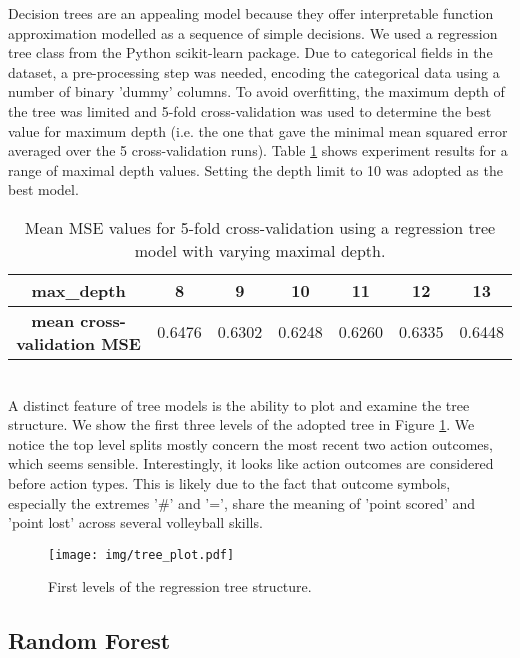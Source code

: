 \documentclass{sfuthesis}
\begin{document}
	Decision trees are an appealing model because they offer interpretable function approximation modelled as a sequence of simple decisions. We used a regression tree class from the Python scikit-learn package. Due to categorical fields in the dataset, a pre-processing step was needed, encoding the categorical data using a number of binary 'dummy' columns. To avoid overfitting, the maximum depth of the tree was limited and 5-fold cross-validation was used to determine the best value for maximum depth (i.e. the one that gave the minimal mean squared error averaged over the 5 cross-validation runs). Table \ref{tab:tree-mse} shows experiment results for a range of maximal depth values. Setting the depth limit to 10 was adopted as the best model.
	\begin{table}[ht]
		\centering
		\begin{tabular}{c|cccccc}
			\textbf{max\_depth}                & 8      & 9      & 10     & 11     & 12     & 13     \\ \hline
			\textbf{mean cross-validation MSE} & 0.6476 & 0.6302 & 0.6248 & 0.6260 & 0.6335 & 0.6448
		\end{tabular}
		\caption{Mean MSE values for 5-fold cross-validation using a regression tree model with varying maximal depth.}
		\label{tab:tree-mse}
	\end{table}
	\\A distinct feature of tree models is the ability to plot and examine the tree structure. We show the first three levels of the adopted tree in Figure \ref{fig:tree-plot}. We notice the top level splits mostly concern the most recent two action outcomes, which seems sensible. Interestingly, it looks like action outcomes are considered before action types. This is likely due to the fact that outcome symbols, especially the extremes '\#' and '=', share the meaning of 'point scored' and 'point lost' across several volleyball skills.
	\begin{figure}[ht]
		\texttt{[image: img/tree\_plot.pdf]}
		\caption{First levels of the regression tree structure.}
		\label{fig:tree-plot}
	\end{figure}
	
	\subsection{Random Forest}
	
\end{document}
